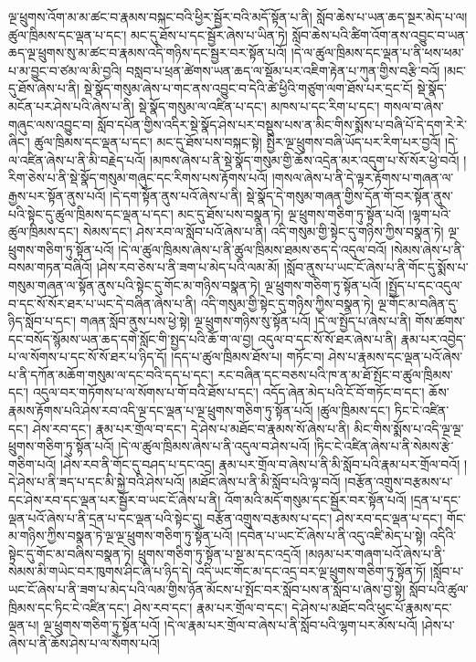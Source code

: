 ལྔ་ཕྲུགས་འོག་མ་མ་ཚང་བ་རྣམས་བསྐང་བའི་ཕྱིར་སྦྱོར་བའི་མདོ་སྟོན་པ་ནི། སློབ་ཆེས་པ་ཡན་ཆད་སྔར་མེད་པ་ལ། ཚུལ་ཁྲིམས་དང་ལྡན་པ་དང་། མང་དུ་ཐོས་པ་དང་སྦྱོར་ཞེས་པ་ཡིན་ཏེ། སློབ་ཆེས་པའི་ཚིག་འོག་ནས་འབྱུང་བ་ཡན་ཆད་ལྔ་ཕྲུགས་སུ་མ་ཚང་བ་རྣམས་འདི་གཉིས་དང་སྦྱར་བར་སྟོན་པའོ། །དེ་ལ་ཚུལ་ཁྲིམས་དང་ལྡན་པ་ནི་ཕས་ཕམ་པ་མ་བྱུང་བ་ཙམ་ལ་མི་བྱའི། བསླབ་པ་ཕྲན་ཚེགས་ཡན་ཆད་ལ་སྡོམ་པར་འཇིག་རྟེན་པ་ཀུན་གྱིས་བརྩི་བའོ། །མང་དུ་ཐོས་ཞེས་པ་ནི། སྡེ་སྣོད་གསུམ་ཞེས་པ་གང་ནས་འབྱུང་བ་དེའི་ཚེ་ཕྱིའི་གཙུག་ལག་ཐོས་པར་དྲང་ངོ། སྡེ་སྣོད་མངོན་པར་ཤེས་པའི་ཞེས་པ་ནི། སྡེ་སྣོད་གསུམ་ལ་འཛིན་པ་དང་། མཁས་པ་དང་རིག་པ་དང་། གསལ་བ་ཞེས་གཞུང་ལས་འབྱུང་བ། སློབ་དཔོན་གྱིས་འདིར་སྡེ་སྣོད་ཤེས་པར་བསྡུས་པས་ན་མིང་གིས་སྨོས་པ་བཞི་པོ་དེ་དག་རེ་རེ་ཞིང་། ཚུལ་ཁྲིམས་དང་ལྡན་པ་དང་། མང་དུ་ཐོས་པས་བསྐང་སྟེ། སྤྱིར་ལྔ་ཕྲུགས་བཞི་ཡོད་པར་རིག་པར་བྱའོ། །དེ་ལ་འཛིན་ཞེས་པ་ནི་མི་བརྗེད་པའོ། །མཁས་ཞེས་པ་ནི་སྡེ་སྣོད་གསུམ་གྱི་ཆོས་འདྲེན་མར་འདུག་པ་སོ་སོར་ཕྱེ་བའོ། །རིག་ཅེས་པ་ནི་སྡེ་སྣོད་གསུམ་གཞུང་དང་རིགས་པས་རྟོགས་པའོ། །གསལ་ཞེས་པ་ནི་དེ་ལྟར་རྟོགས་པ་གཞན་ལ་རྒྱས་པར་སྟོན་ནུས་པའོ། །དེ་དག་སྟོན་ནུས་པའོ་ཞེས་པ་ནི། སྡེ་སྣོད་དེ་གསུམ་གཞན་གྱིས་དོན་གོ་བར་སྟོན་ནུས་པའི་སྟེང་དུ་ཚུལ་ཁྲིམས་དང་ལྡན་པ་དང་། མང་དུ་ཐོས་པས་བསྣན་ཏེ། ལྔ་ཕྲུགས་གཅིག་ཏུ་སྟོན་པའོ། །ལྷག་པའི་ཚུལ་ཁྲིམས་དང་། སེམས་དང་། ཤེས་རབ་ལ་སློབ་པའོ་ཞེས་པ་ནི། འདི་གསུམ་གྱི་སྟེང་དུ་གཉིས་ཀྱིས་བསྣན་ཏེ། ལྔ་ཕྲུགས་གཅིག་ཏུ་སྟོན་པའོ། །དེ་ལ་ཚུལ་ཁྲིམས་ཞེས་པ་ནི་ཚུལ་ཁྲིམས་ཐམས་ཅད་དེ་འདུལ་བའོ། །སེམས་ཞེས་པ་ནི་བསམ་གཏན་བཞིའོ། །ཤེས་རབ་ཅེས་པ་ནི་ཟག་པ་མེད་པའི་ལམ་མོ། །སློབ་ནུས་པ་ཡང་ངོ་ཞེས་པ་ནི་གོང་དུ་སྨོས་པ་གསུམ་གཞན་ལ་སྟོན་ནུས་པའི་སྟེང་དུ་གོང་མ་གཉིས་བསྣན་ཏེ། ལྔ་ཕྲུགས་གཅིག་ཏུ་སྟོན་པའོ། །སྤྱོད་པ་དང་འདུལ་བ་དང་སོ་སོར་ཐར་པ་ཡང་དེ་བཞིན་ཞེས་པ་ནི། འདི་གསུམ་གྱི་སྟེང་དུ་གཉིས་ཀྱིས་བསྣན་ཏེ། ལྔ་གོང་མ་བཞིན་དུ་ཉིད་སློབ་པ་དང་། གཞན་སློབ་ནུས་པས་ཕྱེ་སྟེ། ལྔ་ཕྲུགས་གཉིས་སུ་སྟོན་པའོ། །དེ་ལ་སྤྱོད་པ་ཞེས་པ་ནི། གོས་ཚགས་དང་བསོད་སྙོམས་ཡན་ཆད་དགེ་སློང་གི་སྤྱད་པའི་ཆོ་ག་ལ་བྱ། འདུལ་བ་དང་སོ་སོ་ཐར་ཞེས་པ་ནི། རྣམ་པར་འབྱེད་པ་ལ་སོགས་པ་དང་སོ་སོ་ཐར་པ་ཉིད་དོ། །དད་པ་ཚུལ་ཁྲིམས་ཐོས་པ། གཏོང་བ། ཤེས་པ་རྣམས་དང་ལྡན་པའོ་ཞེས་པ་ནི་དཀོན་མཆོག་གསུམ་ལ་དང་བའི་དད་པ་དང་། རང་བཞིན་དང་བཅས་པའི་ཁ་ན་མ་ཐོ་སྤོང་བ་ཚུལ་ཁྲིམས་དང་། འདུལ་བར་གཏོགས་པ་ལ་སོགས་པ་གོ་བའི་ཐོས་པ་དང་། འདོད་ཞེན་མེད་པའི་ངོ་བོ་གཏོང་བ་དང་། ཆོས་རྣམས་རྟོགས་པའི་ཤེས་རབ་འདི་ལྔ་དང་ལྡན་པ་ལྔ་ཕྲུགས་གཅིག་ཏུ་སྟོན་པའོ། །ཚུལ་ཁྲིམས་དང་། ཏིང་ངེ་འཛིན་དང་། ཤེས་རབ་དང་། རྣམ་པར་གྲོལ་བ་དང་། དེ་ཤེས་པ་མཐོང་བ་རྣམས་སོ་ཞེས་པ་ནི། མིང་གིས་སྨོས་པ་འདི་ལྔ་ལྔ་ཕྲུགས་གཅིག་ཏུ་སྟོན་པའོ། །དེ་ལ་ཚུལ་ཁྲིམས་ཞེས་པ་ནི་འདུལ་བ་ཤེས་པའོ། །ཏིང་ངེ་འཛིན་ཞེས་པ་ནི་སེམས་རྩེ་གཅིག་པའོ། །ཤེས་རབ་ནི་གོང་དུ་བཤད་པ་དང་འདྲ། རྣམ་པར་གྲོལ་བ་ཞེས་པ་ནི་མི་སློབ་པའི་རྣམ་པར་གྲོལ་བའོ། །དེ་ཤེས་པ་ནི་ཟད་པ་དང་མི་སྐྱེ་བའི་ཤེས་པའོ། །མཐོང་ཞེས་པ་ནི་མི་སློབ་པའི་ལྟ་བའོ། །བརྩོན་འགྲུས་བརྩམས་པ་དང་ཤེས་རབ་དང་ལྡན་པར་སྦྱོར་བ་ཡང་ངོ་ཞེས་པ་ནི། འོག་མའི་མདོ་གསུམ་དང་སྦྱོར་བར་སྟོན་པའོ། །དྲན་པ་དང་ལྡན་པའོ་ཞེས་པ་ནི་དྲན་པ་དང་ལྡན་པའི་སྟེང་དུ། བརྩོན་འགྲུས་བརྩམས་པ་དང་། ཤེས་རབ་དང་ལྡན་པ་དང་། གོང་མ་གཉིས་ཀྱིས་བསྣན་ཏེ་ལྔ་ལྔ་ཕྲུགས་གཅིག་ཏུ་སྟོན་པའོ། །དབེན་པ་ཡང་ངོ་ཞེས་པ་ནི་འདུ་འཛི་མེད་པ་སྟེ། འདིའི་སྟེང་དུ་གོང་མ་བཞིས་བསྣན་ཏེ། ཕྲུགས་གཅིག་ཏུ་སྟོན་པ་སྔ་མ་དང་འདྲའོ། །མཉམ་པར་གཞག་པའོ་ཞེས་པ་ནི་སེམས་མི་གཡེང་བར་ཁུགས་ཤིང་ཞི་པ་ཉིད་དེ། འདི་ཡང་གོང་མ་དང་འདྲ་བར་ལྔ་ཕྲུགས་གཅིག་ཏུ་སྟོན་ཏོ། །སློབ་པ་ཡང་ངོ་ཞེས་པ་ནི་ཟག་པ་མེད་པའི་ལམ་གྱིས་ཉོན་མོངས་པ་སྤོང་བར་སློབ་པས་ན་སློབ་པ་ཞེས་བྱ་སྟེ། སློབ་པའི་ཚུལ་ཁྲིམས་དང་ཏིང་ངེ་འཛིན་དང་། ཤེས་རབ་དང་། རྣམ་པར་གྲོལ་བ་དང་། དེ་ཤེས་པ་མཐོང་བའི་ཕུང་པོ་རྣམས་དང་ལྡན་པ། ལྔ་ཕྲུགས་གཅིག་ཏུ་སྟོན་པའོ། །དེ་ལ་རྣམ་པར་གྲོལ་བ་ཞེས་པ་ནི་སློབ་པའི་ལྷག་པར་མོས་པའོ། །ཤེས་པ་ཞེས་པ་ནི་ཆོས་ཤེས་པ་ལ་སོགས་པའོ། 